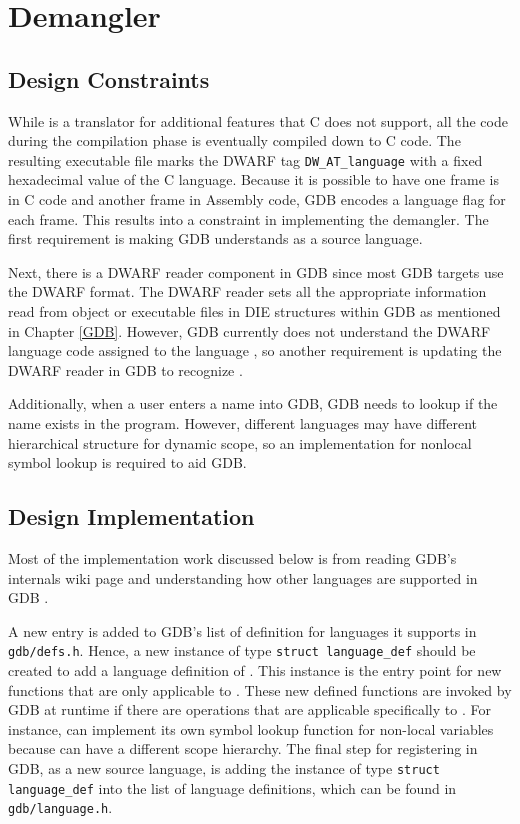 \chapter{\CFAS Demangler} \label{demangler}

\section{Design Constraints}
While \CFAS is a translator for additional features that C does not support, all
the code during the compilation phase is eventually compiled down to C code.
The resulting executable file marks the DWARF tag \verb|DW_AT_language| with a
fixed hexadecimal value of the C language. Because it is possible to have one frame is in C code and another
frame in Assembly code, GDB encodes a language flag for each frame. This
results into a constraint in implementing the demangler. The first requirement is
making GDB understands \CFAS as a source language.

Next, there is a DWARF reader component in GDB since most GDB targets use the DWARF
format. The DWARF reader sets all the appropriate information read from object or
executable files in DIE structures within GDB as mentioned in Chapter
\ref{GDB}. However, GDB currently does not understand the DWARF language code
assigned to the
language \CFA, so another requirement is updating the DWARF reader in GDB to
recognize \CFA.

Additionally, when a user enters a name into GDB, GDB needs to lookup if the
name exists in the program. However, different languages may have different
hierarchical structure for dynamic scope, so an implementation for nonlocal
symbol lookup is required to aid GDB.

\section{Design Implementation}
Most of the implementation work discussed below is from reading GDB's internals
wiki page and understanding how other languages are supported in GDB \cite{reference5}.

A new entry is added to GDB's list of definition for languages it supports in
\verb|gdb/defs.h|. Hence, a new instance of type \verb|struct language_def|
should be created to add a language definition of \CFAS. This instance is the
entry point for new functions that are only applicable to \CFA. These new
defined functions are invoked by GDB at runtime if there are operations that
are applicable specifically to \CFA. For instance, \CFAS can implement its
own symbol lookup function for non-local variables because \CFAS can have a
different scope hierarchy. The final step for registering \CFAS in GDB, as a new
source language, is adding the instance of type \verb|struct language_def| into
the list of language definitions, which can be found in
\verb|gdb/language.h|.

